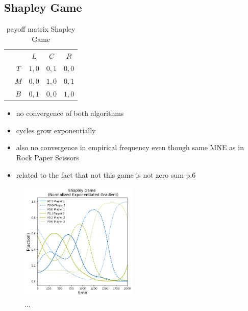 \subsection{Shapley Game}\label{subsection:shapleyGame}

\begin{table}\centering
\setlength{\extrarowheight}{2pt}
\begin{tabular}{cc|c|c|c|}
  & \multicolumn{1}{c}{} & \multicolumn{1}{c}{$L$}  & \multicolumn{1}{c}{$C$}  & \multicolumn{1}{c}{$R$} \\\cline{3-5}
            & $T$ & $1,0$ & $0,1$ & $0,0$ \\ \cline{3-5}
            & $M$ & $0,0$ & $1,0$ & $0,1$ \\\cline{3-5}
            & $B$ & $0,1$ & $0,0$ & $1,0$ \\\cline{3-5}
\end{tabular}\caption{\label{tab:payoffShapley}payoff matrix Shapley Game}
\end{table}

\begin{itemize}
    \item no convergence of both algorithms
    \item cycles grow exponentially
    \item also no convergence in empirical frequency even though same MNE as in Rock Paper Scissors
    \item related to the fact that not this game is not zero sum \cite{jafari} p.6
\end{itemize}

\begin{figure}
    \centering
    \includegraphics[width=0.5\textwidth]{logos/Shapley1.png}
    \caption{...}
    \label{Shapley1}
\end{figure}

